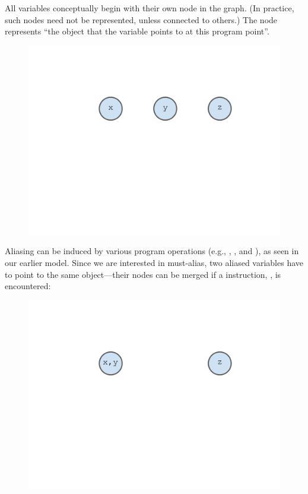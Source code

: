 All variables conceptually begin
with their own node in the graph. (In practice, such nodes need not be
represented, unless connected to others.)  The node represents ``the
object that the variable points to at this program point''.

\begin{figure}[h]
  \begin{minipage}[b]{\linewidth}
    \centering
    \includegraphics[trim={35mm 115mm 35mm 51mm},clip,width=0.8\linewidth]{assets/must-data/alias-graph0.pdf}
  \end{minipage}
\end{figure}

Aliasing can be induced by various program operations (e.g.,
, , and ), as seen in
our earlier model. Since we are interested in must-alias, two
aliased variables have to point to the same object---their nodes
can be merged if a  instruction, , is
encountered:

\begin{figure}[h]
  \begin{minipage}[b]{\linewidth}
    \centering
    \includegraphics[trim={35mm 115mm 35mm 51mm},clip,width=0.8\linewidth]{assets/must-data/alias-graph1.pdf}
  \end{minipage}
\end{figure}

